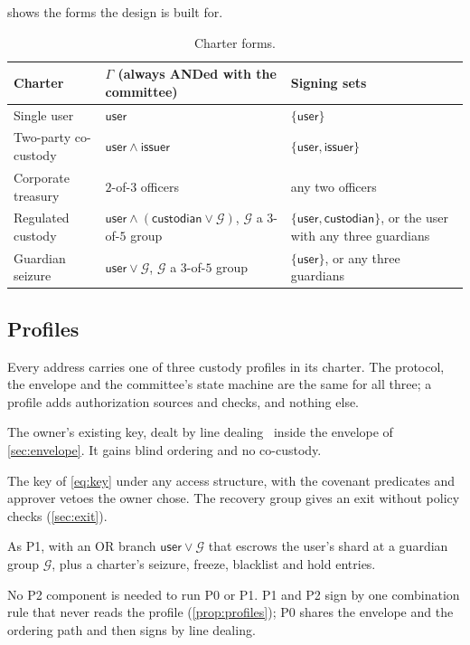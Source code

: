  shows the forms the design is built for.

\begin{table}[t]
\centering
\small
\begin{tabularx}{\linewidth}{@{}l>{\raggedright\arraybackslash}X>{\raggedright\arraybackslash}X@{}}
\toprule
Charter & $\Gamma$ (always ANDed with the committee) & Signing sets \\
\midrule
Single user & $\mathsf{user}$ & $\{\mathsf{user}\}$ \\
Two-party co-custody & $\mathsf{user} \wedge \mathsf{issuer}$ & $\{\mathsf{user}, \mathsf{issuer}\}$ \\
Corporate treasury & $2$-of-$3$ officers & any two officers \\
Regulated custody & $\mathsf{user} \wedge (\mathsf{custodian} \vee \mathcal{G})$, $\mathcal{G}$ a $3$-of-$5$ group & $\{\mathsf{user}, \mathsf{custodian}\}$, or the user with any three guardians \\
Guardian seizure & $\mathsf{user} \vee \mathcal{G}$, $\mathcal{G}$ a $3$-of-$5$ group & $\{\mathsf{user}\}$, or any three guardians \\
\bottomrule
\end{tabularx}
\caption{Charter forms.}
\label{tab:charters}
\end{table}

\subsection{Profiles}\label{sec:profiles}

Every address carries one of three custody profiles in its charter. The protocol, the envelope and the committee's state machine are the same for all three; a profile adds authorization sources and checks, and nothing else.

\begin{description}[leftmargin=1.5em,itemsep=1pt]
\item[P0, existing key.] The owner's existing key, dealt by line dealing~\cite{LD} inside the envelope of \cref{sec:envelope}. It gains blind ordering and no co-custody.
\item[P1, co-custody.] The key of \eqref{eq:key} under any access structure, with the covenant predicates and approver vetoes the owner chose. The recovery group gives an exit without policy checks (\cref{sec:exit}).
\item[P2, regulated.] As P1, with an OR branch $\mathsf{user} \vee \mathcal{G}$ that escrows the user's shard at a guardian group $\mathcal{G}$, plus a charter's seizure, freeze, blacklist and hold entries.
\end{description}
No P2 component is needed to run P0 or P1. P1 and P2 sign by one combination rule that never reads the profile (\cref{prop:profiles}); P0 shares the envelope and the ordering path and then signs by line dealing.

